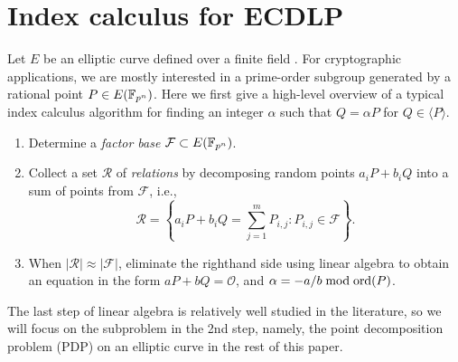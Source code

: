 %
%

\section{Index calculus for ECDLP}
%
\label{sec:index-calculus-ecdlp}
%
Let $E$ be an elliptic curve defined over a finite field .
%
For cryptographic applications, we are mostly interested in a
prime-order subgroup generated by a rational point $P\in E(\mathbb F_{p^n})$.
%
Here we first give a high-level overview of a typical index calculus
algorithm for finding an integer $\alpha$ such that $Q=\alpha P$ for
$Q\in\langle P\rangle$.
%
\begin{enumerate}
%
\item Determine a \emph{factor base} $\mathcal F\subset E(\mathbb F_{p^n})$.
%
\item Collect a set $\mathcal R$ of \emph{relations} by decomposing
  random points $a_iP+b_iQ$ into a sum of points from $\mathcal F$,
  i.e.,
  \[ \mathcal
    R=\left\{a_iP+b_iQ=\sum_{j=1}^mP_{i,j}:P_{i,j}\in\mathcal
      F\right\}. \]
%
\item When $|\mathcal R|\approx|\mathcal F|$, eliminate the righthand
  side using linear algebra to obtain an equation in the form
  $aP+bQ=\mathcal O$, and $\alpha=-a/b\bmod\operatorname{ord}(P)$.
%
\end{enumerate}
%
The last step of linear algebra is relatively well studied in the
literature, so we will focus on the subproblem in the 2nd step,
namely, the point decomposition problem (PDP) on an elliptic curve in
the rest of this paper.
%

